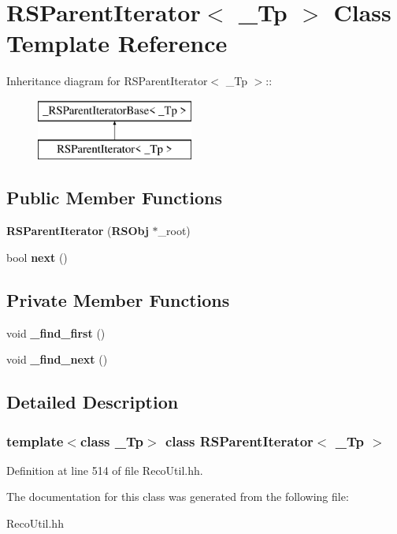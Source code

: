 \section{RSParentIterator$<$ \_\-Tp $>$ Class Template Reference}
\label{classRSParentIterator}
Inheritance diagram for RSParentIterator$<$ \_\-Tp $>$::\begin{figure}[H]
\begin{center}
\leavevmode
\includegraphics[height=2cm]{classRSParentIterator}
\end{center}
\end{figure}
\subsection*{Public Member Functions}
\begin{DoxyCompactItemize}
\item 
{\bfseries RSParentIterator} ({\bf RSObj} $\ast$\_\-root)\label{classRSParentIterator_a9617420a9952b2226df03c6c3f63875a}

\item 
bool {\bfseries next} ()\label{classRSParentIterator_a6885cd9f51ba64293cf0c4006b956dd7}

\end{DoxyCompactItemize}
\subsection*{Private Member Functions}
\begin{DoxyCompactItemize}
\item 
void {\bfseries \_\-find\_\-first} ()\label{classRSParentIterator_a710e28d238ff48bb73912f506a6601e4}

\item 
void {\bfseries \_\-find\_\-next} ()\label{classRSParentIterator_ad51eac67fa21053e85720cd673970d85}

\end{DoxyCompactItemize}


\subsection{Detailed Description}
\subsubsection*{template$<$class \_\-Tp$>$ class RSParentIterator$<$ \_\-Tp $>$}



Definition at line 514 of file RecoUtil.hh.

The documentation for this class was generated from the following file:\begin{DoxyCompactItemize}
\item 
RecoUtil.hh\end{DoxyCompactItemize}
